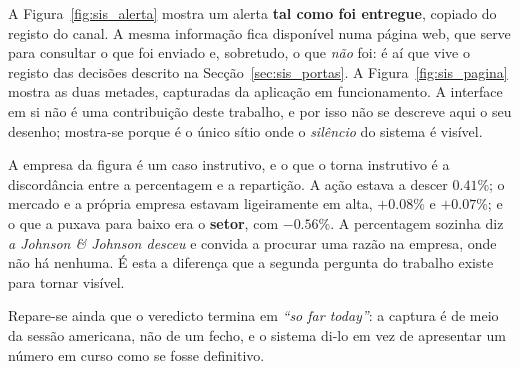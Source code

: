 A Figura~\ref{fig:sis_alerta} mostra um alerta \textbf{tal como foi entregue}, copiado do registo
do canal. A mesma informação fica disponível numa página web, que serve para consultar o que foi
enviado e, sobretudo, o que \emph{não} foi: é aí que vive o registo das decisões descrito na
Secção~\ref{sec:sis_portas}. A Figura~\ref{fig:sis_pagina} mostra as duas metades, capturadas
da aplicação em funcionamento. A interface em si não é uma contribuição deste trabalho, e por
isso não se descreve aqui o seu desenho; mostra-se porque é o único sítio onde o \emph{silêncio}
do sistema é visível.

A empresa da figura é um caso instrutivo, e o que o torna instrutivo é a discordância entre a
percentagem e a repartição. A ação estava a descer $0.41\%$; o mercado e a própria empresa
estavam ligeiramente em alta, $+0.08\%$ e $+0.07\%$; e o que a puxava para baixo era o
\textbf{setor}, com $-0.56\%$. A percentagem sozinha diz \emph{a Johnson \& Johnson desceu} e
convida a procurar uma razão na empresa, onde não há nenhuma. É esta a diferença que a segunda
pergunta do trabalho existe para tornar visível.

Repare-se ainda que o veredicto termina em \emph{``so far today''}: a captura é de meio da
sessão americana, não de um fecho, e o sistema di-lo em vez de apresentar um número em curso
como se fosse definitivo.


